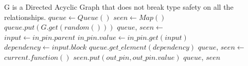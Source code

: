 \documentclass[12pt, varwidth=20cm]{standalone}
\begin{document}
  \begin{algorithmic}[1]
    \Require G is a Directed Acyclic Graph that does not break
    type safety on all the relationships.
      \State $queue \gets Queue()$
      \State $seen \gets Map()$
      \State $queue.put(G.get(random()))$ 
        \State $queue$, $seen \gets$ 
      \EndWhile
    \EndFunction
    \\
        \State $input \gets in\_pin.parent$
          \State $in\_pin.value \gets in\_pin.get(input)$
        \Else
          \State $dependency \gets input.block$
           
            \State $queue.get\_element(dependency)$
          \EndIf
          \State $queue$, $seen \gets$ 
        \EndIf
      \EndFor
      \State $current.function()$ 
        \State $seen.put(out\_pin, out\_pin.value)$
      \EndFor
      \State \Return $queue$, $seen$
    \EndFunction
  \end{algorithmic}
\end{document}
